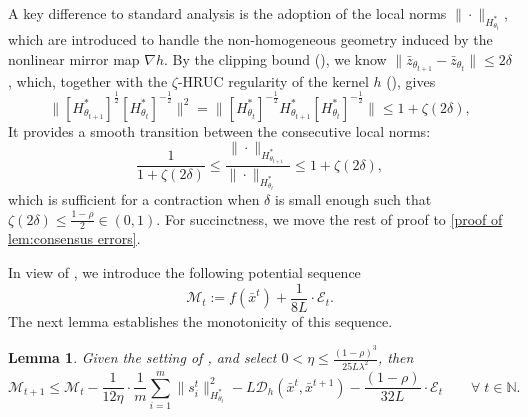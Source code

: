 \documentclass{article}
\theoremstyle{plain}
\newtheorem{lemma}[theorem]{Lemma}
\theoremstyle{definition}
\theoremstyle{remark}
\newcommand{\N}{\mathbb{N}}
\newcommand{\sL}{L}
\newcommand{\cE}{\mathcal E}
\newcommand{\cD}{\mathcal{D}_{h}}
\newcommand{\cM}{\mathcal{M}}
\begin{document}
A key difference to standard analysis is the adoption of the local norms $\|\cdot\|_{H_{\theta_t}^*}$, which are introduced to handle the non-homogeneous geometry induced by the  nonlinear mirror map $\nabla h$. By the clipping bound (), we know $\|\bar{z}_{\theta_{t+1}}-\bar{z}_{\theta_t}\|\leq 2\delta$, which, together with the $\zeta$-HRUC regularity of the kernel $h$ (), gives 
\begin{equation}
    \label{eqn:H-rel-diff}
    \Big\|[H_{\theta_{t+1}}^*]^{\frac{1}{2}}[H_{\theta_t}^*]^{-\frac{1}{2}}\Big\|^2
    =\Big\|[H_{\theta_t}^*]^{-\frac{1}{2}}H_{\theta_{t+1}}^*[H_{\theta_t}^*]^{-\frac{1}{2}}\Big\|
    \leq 1+\zeta(2\delta),
\end{equation}
It provides a smooth transition between the consecutive local norms: 
$$\frac{1}{1+\zeta(2\delta)}\leq \frac{\|\cdot\|_{H_{\theta_{t+1}}^*}}{\|\cdot\|_{H_{\theta_t}^*}\,\,\,\,\,} \leq    1+\zeta(2\delta),$$ which is sufficient for a contraction when  $\delta$ is small enough such that $\zeta(2\delta)\leq \frac{1-\rho}{2}\in(0,1)$. For succinctness, we move the rest of proof to %
  \cref{proof of lem:consensus errors}.

In view of , we introduce the following potential sequence 
$$\cM_{t}:=f(\bar x^{t}) + \frac{1}{8\sL}\cdot \cE_t.$$
The next lemma establishes the monotonicity of this sequence.  

\begin{lemma}\label{prop:descent}
Given the setting of ,  and select $0<\eta \leq \frac{(1-\rho)^{3}}{25\sL\lambda^2}$, then    
\begin{equation}\label{eq:prop:descent}
\cM_{t+1}\leq \cM_t - \frac{1}{12\eta}\cdot \frac{1}{m}{\sum}_{i=1}^m\|s^t_i\|_{H_{\theta_t}^*}^2 - \sL  \cD(\bar x^t,\bar x^{t+1}) -\frac{(1-\rho)}{32 \sL}\cdot \cE_t  \qquad \forall\;t\in\N.
\end{equation}
\end{lemma}
\end{document}

